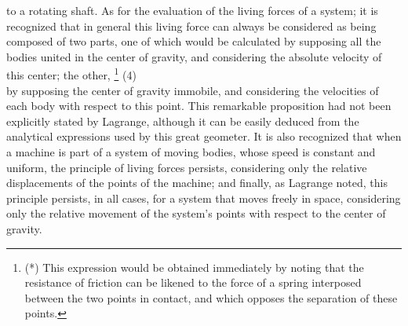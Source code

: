 \documentclass{book}
\begin{document}
to a rotating shaft. As for the evaluation of the living forces of a system; it is recognized that in general this living force can always be considered as being composed of two parts, one of which would be calculated by supposing all the bodies united in the center of gravity, and considering the absolute velocity of this center; the other, 
\footnote{(*) This expression would be obtained immediately by noting that the resistance of friction can be likened to the force of a spring interposed between the two points in contact, and which opposes the separation of these points.}
\newpage
(4)\\
by supposing the center of gravity immobile, and considering the velocities of each body with respect to this point.
This remarkable proposition had not been explicitly stated by Lagrange, although it can be easily deduced from the analytical expressions used by this great geometer. It is also recognized that when a machine is part of a system of moving bodies, whose speed is constant and uniform, the principle of living forces persists, considering only the relative displacements of the points of the machine; and finally, as Lagrange noted, this principle persists, in all cases, for a system that moves freely in space, considering only the relative movement of the system's points with respect to the center of gravity.
\end{document}
